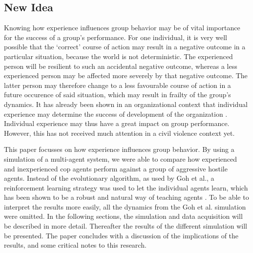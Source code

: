 \subsection{New Idea}
Knowing how experience influences group behavior may be of vital importance for the success of a group's performance.
For one individual, it is very well possible that the `correct' course of action may result in a negative outcome in a particular situation, because the world is not deterministic.
The experienced person will be resilient to such an accidental negative outcome, whereas a less experienced person may be affected more severely by that negative outcome.
The latter person may therefore change to a less favourable course of action in a future occurence of said situation, which may result in frailty of the group's dynamics.
It has already been shown in an organizational context that individual experience may determine the success of development of the organization \citep*{reagans2005individual}.
Individual experience may thus have a great impact on group performance.
However, this has not received much attention in a civil violence context yet.

This paper focusses on how experience influences group behavior.
 By using a simulation of a multi-agent system, we were able to compare how experienced and inexperienced cop agents perform against a group of aggressive hostile agents. Instead of the evolutionary algorithm, as used by Goh et al., a reinforcement learning strategy was used to let the individual agents learn, which has been shown to be a robust and natural way of teaching agents \citep{claus1998dynamics}. To be able to interpret the results more easily, all the dynamics from the Goh et al. simulation were omitted. In the following sections, the simulation and data acquisition will be described in more detail.
 Thereafter the results of the different simulation will be presented.
 The paper concludes with a discussion of the implications of the results, and some critical notes to this research.
 
